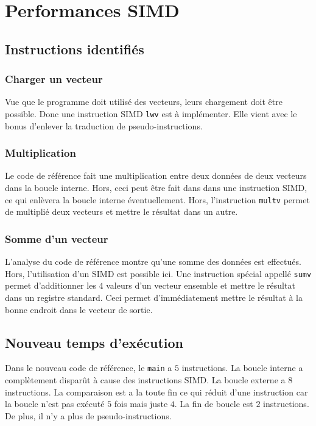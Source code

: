 \documentclass[a11paper]{article}
\begin{document}
\section{Performances SIMD}

\subsection{Instructions identifiés}
\subsubsection{Charger un vecteur}
Vue que le programme doit utilisé des vecteurs, leurs chargement doit être
possible. Donc une instruction SIMD \verb|lwv| est à implémenter. Elle vient
avec le bonus d'enlever la traduction de pseudo-instructions.

\subsubsection{Multiplication}
Le code de référence fait une multiplication entre deux données de deux
vecteurs dans la boucle interne. Hors, ceci peut être fait dans dans une
instruction SIMD, ce qui enlèvera la boucle interne éventuellement. Hors,
l'instruction \verb|multv| permet de multiplié deux vecteurs et mettre le
résultat dans un autre.

\subsubsection{Somme d'un vecteur}
L'analyse du code de référence montre qu'une somme des données est effectués.
Hors, l'utilisation d'un SIMD est possible ici. Une instruction spécial appellé
\verb|sumv| permet d'additionner les $4$ valeurs d'un vecteur ensemble et
mettre le résultat dans un registre standard. Ceci permet d'immédiatement
mettre le résultat à la bonne endroit dans le vecteur de sortie.

\subsection{Nouveau temps d'exécution}
Dans le nouveau code de référence, le \verb|main| a $5$ instructions. La boucle
interne a complètement disparût à cause des instructions SIMD. La boucle
externe a $8$ instructions. La comparaison est a la toute fin ce qui réduit
d'une instruction car la boucle n'est pas exécuté $5$ fois mais juste $4$. La
fin de boucle est $2$ instructions. De plus, il n'y a plus de pseudo-instructions.
\end{document}
